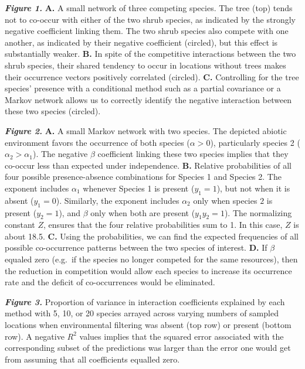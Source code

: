 \documentclass[12pt,]{article}
\begin{document}
\begin{spacing}{1.9}
\begin{flushleft}
\textbf{\emph{Figure 1.}} \textbf{A.} A small network of three competing
species. The tree (top) tends not to co-occur with either of the two
shrub species, as indicated by the strongly negative coefficient linking
them. The two shrub species also compete with one another, as indicated
by their negative coefficient (circled), but this effect is
substantially weaker. \textbf{B.} In spite of the competitive
interactions between the two shrub species, their shared tendency to
occur in locations without trees makes their occurrence vectors
positively correlated (circled). \textbf{C.} Controlling for the tree
species' presence with a conditional method such as a partial covariance
or a Markov network allows us to correctly identify the negative
interaction between these two species (circled).

\textbf{\emph{Figure 2.}} \textbf{A.} A small Markov network with two
species. The depicted abiotic environment favors the occurrence of both
species (\(\alpha >0\)), particularly species 2
(\(\alpha_2 > \alpha_1\)). The negative \(\beta\) coefficient linking
these two species implies that they co-occur less than expected under
independence. \textbf{B.} Relative probabilities of all four possible
presence-absence combinations for Species 1 and Species 2. The exponent
includes \(\alpha_1\) whenever Species 1 is present (\(y_1 = 1\)), but
not when it is absent (\(y_1 = 0\)). Similarly, the exponent includes
\(\alpha_2\) only when species \(2\) is present (\(y_2 = 1\)), and
\(\beta\) only when both are present (\(y_1y_2 = 1\)). The normalizing
constant \(Z\), ensures that the four relative probabilities sum to 1.
In this case, \(Z\) is about 18.5. \textbf{C.} Using the probabilities,
we can find the expected frequencies of all possible co-occurrence
patterns between the two species of interest. \textbf{D.} If \(\beta\)
equaled zero (e.g.~if the species no longer competed for the same
resources), then the reduction in competition would allow each species
to increase its occurrence rate and the deficit of co-occurrences would
be eliminated.

\textbf{\emph{Figure 3.}} Proportion of variance in interaction
coefficients explained by each method with 5, 10, or 20 species arrayed
across varying numbers of sampled locations when environmental filtering
was absent (top row) or present (bottom row). A negative \(R^2\) values
implies that the squared error associated with the corresponding subset
of the predictions was larger than the error one would get from assuming
that all coefficients equalled zero.

\end{flushleft}
\end{spacing}
\end{document}
